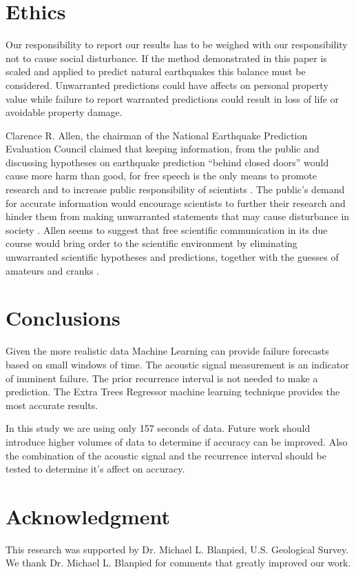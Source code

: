 \documentclass[]{llncs} %
\begin{document}
\section{Ethics}

Our responsibility to report our results has to be weighed with our responsibility not to cause social disturbance. If the method demonstrated in this paper is scaled and applied to predict natural earthquakes this balance must be considered. Unwarranted predictions could have affects on personal property value while failure to report warranted predictions could result in loss of life or avoidable property damage. \par

Clarence R. Allen, the chairman of the National Earthquake Prediction Evaluation Council claimed that keeping information, from the public and discussing hypotheses on earthquake prediction “behind closed doors” would cause more harm than good, for free speech is the only means to promote research and to increase public responsibility of scientists \cite{Ayhan}. The public’s demand for accurate information would encourage scientists to further their research and hinder them from making unwarranted statements that may cause disturbance in society \cite{Ayhan}. Allen seems to suggest that free scientific communication in its due course would bring order to the scientific environment by eliminating unwarranted scientific hypotheses and predictions, together with the guesses of amateurs and cranks \cite{Ayhan}.

\section{Conclusions}

Given the more realistic data Machine Learning can provide failure forecasts based on small windows of time. The acoustic signal measurement is an indicator of imminent failure. The prior recurrence interval is not needed to make a prediction. The Extra Trees Regressor machine learning technique provides the most accurate results.



%
In this study we are using only 157 seconds of data. Future work should introduce higher volumes of data to determine if accuracy can be improved. Also the combination of the acoustic signal and the recurrence interval should be tested to determine it's affect on accuracy.
\par

\section{Acknowledgment}
This research was supported by Dr. Michael L. Blanpied,  U.S. Geological Survey. We thank Dr. Michael L. Blanpied for comments that greatly improved our work.



\end{document}
